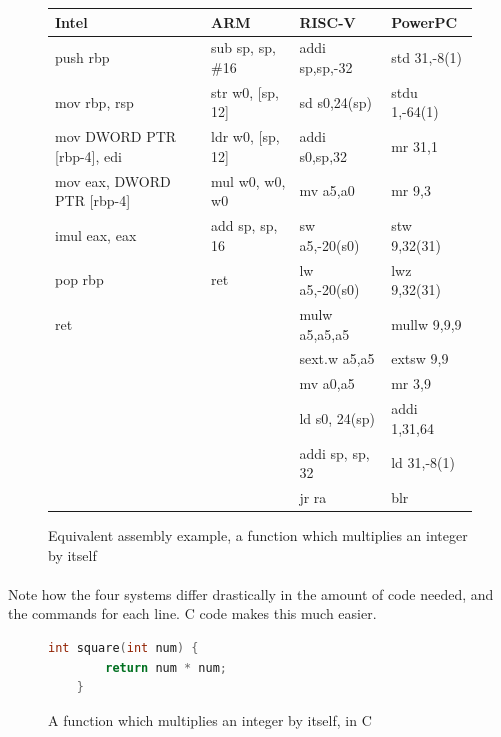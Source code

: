 \documentclass[letter,11pt]{article}
\begin{document}
\begin{figure}[h!]
    \centering
    \begin{tabular}{l l l l}
        Intel & ARM & RISC-V & PowerPC \\ \hline
        push rbp & sub sp, sp, \#16 & addi sp,sp,-32 & std 31,-8(1) \\
        mov rbp, rsp & str w0, [sp, 12] & sd s0,24(sp) & stdu 1,-64(1) \\
        mov DWORD PTR [rbp-4], edi & ldr w0, [sp, 12] & addi s0,sp,32 & mr 31,1 \\
        mov eax, DWORD PTR [rbp-4] & mul w0, w0, w0 & mv  a5,a0 & mr 9,3 \\
        imul eax, eax & add sp, sp, 16 & sw a5,-20(s0) & stw 9,32(31) \\
        pop rbp	& ret & lw a5,-20(s0)   & lwz 9,32(31) \\
        ret	&         & mulw a5,a5,a5   & mullw 9,9,9 \\
	    &         & sext.w a5,a5    & extsw 9,9 \\
		&         & mv a0,a5        & mr 3,9 \\
		&         & ld s0, 24(sp)   & addi 1,31,64 \\
		&         & addi sp, sp, 32 & ld 31,-8(1) \\
		&         & jr ra           & blr
    \end{tabular}
    \caption{Equivalent assembly example, a function which multiplies an integer by itself}
    \label{fig:assemblyexample}
\end{figure}

\paragraph{}Note how the four systems differ drastically in the amount of code needed, and the commands for each line. C code makes this much easier.

\begin{figure}[h!]
    \centering
    \begin{lstlisting}[language=C,basicstyle=\footnotesize,keywordstyle=\color{blue},commentstyle=\color{green},showstringspaces=false,stringstyle=\color{red}]
    int square(int num) {
        return num * num;
    }
    \end{lstlisting}
    \caption{A function which multiplies an integer by itself, in C}
    \label{fig:assemblyexamplecversion}
\end{figure}
\end{document}
